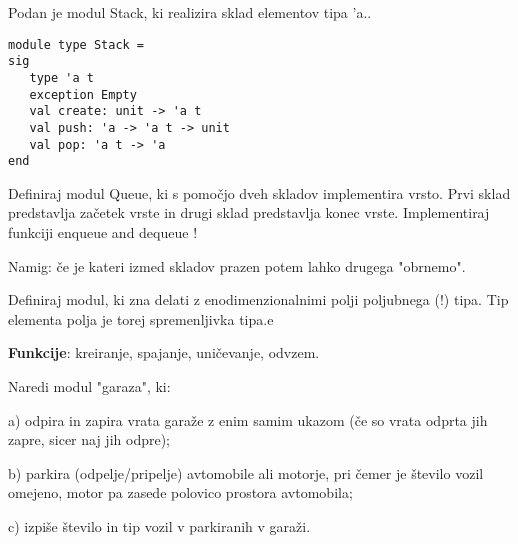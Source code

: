 \begin{ex}
Podan je modul Stack, ki realizira sklad elementov tipa 'a.. 

\begin{lstlisting}
module type Stack = 
sig 
   type 'a t 
   exception Empty 
   val create: unit -> 'a t 
   val push: 'a -> 'a t -> unit 
   val pop: 'a t -> 'a 
end

\end{lstlisting}
Definiraj modul Queue, ki s pomo\v cjo dveh skladov implementira vrsto. Prvi sklad predstavlja za\v cetek vrste in drugi sklad predstavlja konec vrste. Implementiraj funkciji enqueue and dequeue !

Namig: \v ce je kateri izmed skladov prazen potem lahko drugega "obrnemo". 


\end{ex} 
\begin{ex}
Definiraj modul, ki zna delati z enodimenzionalnimi polji poljubnega (!)
tipa. Tip elementa polja je torej spremenljivka tipa.e

\textbf{Funkcije}: kreiranje, spajanje, uni\v cevanje, odvzem.
\end{ex} 
\begin{ex}
Naredi modul "garaza", ki:

a) odpira in zapira vrata gara\v ze z enim samim ukazom (\v ce so vrata
odprta jih zapre, sicer naj jih odpre);

b) parkira (odpelje/pripelje) avtomobile ali motorje, pri \v cemer je
\v stevilo vozil omejeno, motor pa zasede polovico prostora avtomobila;

c) izpi\v se \v stevilo in tip vozil v parkiranih v gara\v zi.
\end{ex}


